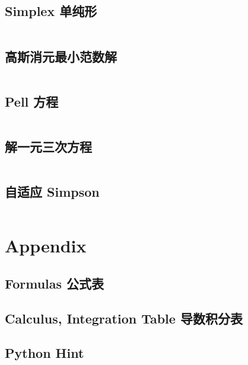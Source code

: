 \documentclass[titlepage, a4paper, 11pt]{article}
\begin{document}
\begin{spacing}{1.15}
				\subsection{Simplex 单纯形}
					\inputminted{cpp}{src/Math/Simplex.cpp}
				\subsection{高斯消元最小范数解}
					\inputminted{cpp}{src/Geometry/minnorm_gauss.cpp}
				\subsection{Pell 方程}
					\inputminted{cpp}{src/Math/Pell方程.cpp}
				\subsection{解一元三次方程}
					\inputminted{cpp}{src/Math/解一元三次方程.cpp}
				\subsection{自适应 Simpson}
					\inputminted{cpp}{src/Math/Simpson.cpp}
		
			
			\section{Appendix}
				\begin{spacing}{0.4}
				\subsection{Formulas 公式表}
					
				\subsection{Calculus, Integration Table 导数积分表}
					
					
				\subsection{Python Hint}
					\inputminted{python}{src/Miscellany/py.py}
				\end{spacing}


\end{spacing}
\end{document}
